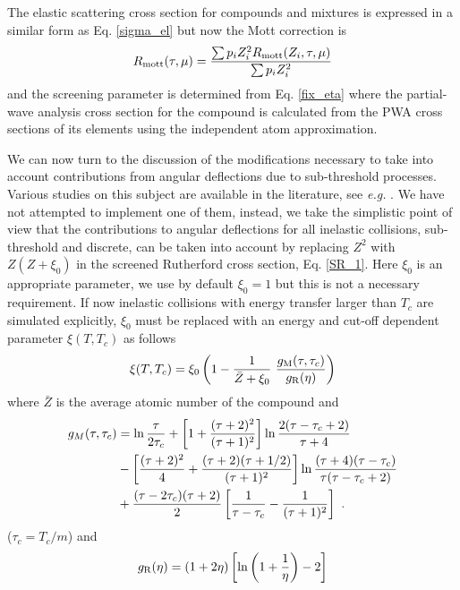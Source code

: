 The elastic scattering cross section for compounds and
mixtures is expressed in a similar form as Eq. \eqref{sigma_el}
but now the Mott correction is
\begin{equation}
R_{\rm mott}(\tau,\mu) = {\sum p_i Z_i^2 R_{\rm mott}(Z_i,\tau,\mu) \over
\sum p_i Z_i^2}
\end{equation}
and the screening parameter is determined from Eq. \eqref{fix_eta} where
the partial-wave analysis cross section for the compound is
calculated from the PWA cross sections of its elements using
the independent atom approximation.

We can now turn to the discussion of the modifications necessary
to take into account contributions from angular deflections
due to sub-threshold processes. Various studies on this subject
are available in the literature, see {\em e.g.} \cite{Sc63,Fa54,BW89}.
We have not attempted to implement one of them, instead, we
take the simplistic point of view that the contributions
to angular deflections for all inelastic collisions, sub-threshold
and discrete, can be taken into account by replacing
$Z^2$ with $Z (Z + \xi_{0})$ in the screened Rutherford
cross section, Eq. \eqref{SR_1}. Here $\xi_0$ is an appropriate
parameter, we use by default $\xi_0=1$ but this is not a necessary
requirement. If now inelastic collisions with energy transfer
larger than $T_c$ are simulated explicitly, $\xi_0$ must
be replaced with an energy and cut-off dependent parameter $\xi(T,T_c)$
as follows \cite{Ka96c}
\begin{equation}
\xi(T,T_c) = \xi_0 \left(1 - {1 \over \bar{Z} + \xi_0}~
{g_{\rm M}(\tau,\tau_c) \over g_{\rm R}(\eta) } \right)
\end{equation}
where $\bar{Z}$ is the average atomic number of the compound
and %
\newcommand{\tpr}{\tau^{\prime}}
\begin{equation}
\begin{split}
g_M(\tau,\tau_c) & =
\ln {\tau \over 2 \tau_c} + \left[1 +
{(\tau + 2)^2 \over (\tau+1)^2} \right] \ln {2 (\tau-\tau_c+2) \over \tau + 4}
\\ &-
\left[{(\tau+2)^2 \over 4} + {(\tau+2) (\tau+1/2) \over (\tau+1)^2} \right]
\ln {(\tau+4) (\tau-\tau_c) \over \tau (\tau-\tau_c+2)} \\ & +
{(\tau-2 \tau_c) (\tau+2) \over 2}
\left[{1 \over \tau-\tau_c} - {1 \over (\tau+1)^2} \right]~.
\end{split}
\end{equation}
($\tau_c = T_c/m$) and
\begin{equation}
g_{\rm R}(\eta) = (1 + 2 \eta) \left[ \ln \left(1 + \frac{1}{\eta} \right) - 2
\right]
\end{equation}

